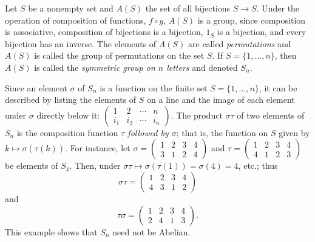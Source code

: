 \begin{example}
Let $S$ be a nonempty set and $A(S)$ the set of all bijections $S\to
S$. Under the operation of composition of functions, $f\circ g$, $A(S)$
is a group, since composition is associative, composition of bijections is
a bijection, $1_S$ is a bijection, and every bijection has an inverse. The
elements of $A(S)$ are called \emph{permutations} and $A(S)$ is called the
group of permutations on the set $S$. If $S=\{1,\dotsc,n\}$, then $A(S)$ is
called the \emph{symmetric group on $n$ letters} and denoted $S_n$.

Since an element $\sigma$ of $S_n$ is a function on the finite set
$S=\{1,\dotsc,n\}$, it can be described by listing the elements of $S$ on a
line and the image of each element under $\sigma$ directly below it:
$\left(\begin{smallmatrix}1&2&\cdots&n\\i_1&i_2&\cdots&i_n\end{smallmatrix}\right)$. The
product $\sigma\tau$ of two elements of $S_n$ is the composition function
\emph{$\tau$ followed by $\sigma$}; that is, the function on $S$ given by
$k\mapsto \sigma(\tau(k))$. For instance, let
$\sigma=\left(\begin{smallmatrix}
1&2&3&4\\
3&1&2&4
\end{smallmatrix}\right)$ and
$\tau=\left(
\begin{smallmatrix}
1&2&3&4\\
4&1&2&3
\end{smallmatrix}
\right)$ be elements of $S_4$. Then, under
$\sigma\tau\mapsto\sigma(\tau(1))=\sigma(4)=4$, etc.; thus
\[
\sigma\tau=
\begin{pmatrix}
1&2&3&4\\
4&3&1&2
\end{pmatrix}
\]
and
\[
\tau\sigma=
\begin{pmatrix}
1&2&3&4\\
2&4&1&3
\end{pmatrix}.
\]
This example shows that $S_n$ need not be Abelian.
\end{example}

